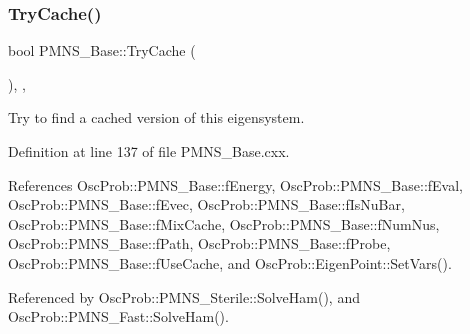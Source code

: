 \subsubsection{\texorpdfstring{Try\+Cache()}{TryCache()}}
{\footnotesize\ttfamily bool P\+M\+N\+S\+\_\+\+Base\+::\+Try\+Cache (\begin{DoxyParamCaption}{ }\end{DoxyParamCaption})\hspace{0.3cm}{\ttfamily [protected]}, {\ttfamily [virtual]}, {\ttfamily [inherited]}}

Try to find a cached version of this eigensystem. 

Definition at line 137 of file P\+M\+N\+S\+\_\+\+Base.\+cxx.



References Osc\+Prob\+::\+P\+M\+N\+S\+\_\+\+Base\+::f\+Energy, Osc\+Prob\+::\+P\+M\+N\+S\+\_\+\+Base\+::f\+Eval, Osc\+Prob\+::\+P\+M\+N\+S\+\_\+\+Base\+::f\+Evec, Osc\+Prob\+::\+P\+M\+N\+S\+\_\+\+Base\+::f\+Is\+Nu\+Bar, Osc\+Prob\+::\+P\+M\+N\+S\+\_\+\+Base\+::f\+Mix\+Cache, Osc\+Prob\+::\+P\+M\+N\+S\+\_\+\+Base\+::f\+Num\+Nus, Osc\+Prob\+::\+P\+M\+N\+S\+\_\+\+Base\+::f\+Path, Osc\+Prob\+::\+P\+M\+N\+S\+\_\+\+Base\+::f\+Probe, Osc\+Prob\+::\+P\+M\+N\+S\+\_\+\+Base\+::f\+Use\+Cache, and Osc\+Prob\+::\+Eigen\+Point\+::\+Set\+Vars().



Referenced by Osc\+Prob\+::\+P\+M\+N\+S\+\_\+\+Sterile\+::\+Solve\+Ham(), and Osc\+Prob\+::\+P\+M\+N\+S\+\_\+\+Fast\+::\+Solve\+Ham().


